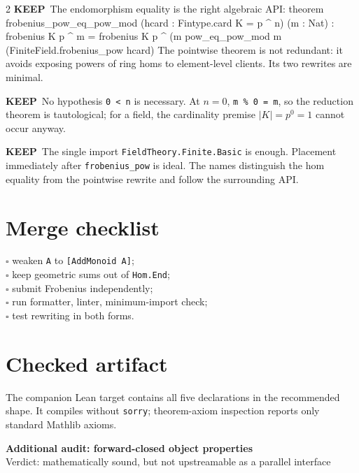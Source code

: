 \documentclass[9pt]{article}
\newenvironment{lean}{\Verbatim[fontsize=\scriptsize,frame=single,framesep=1.2mm,formatcom=\leanfont]}{\endVerbatim}
\newcommand{\good}{\textcolor{keep}{\bfseries KEEP}}
\begin{document}
\begin{multicols}{2}
\good\ The endomorphism equality is the right algebraic API:
\begin{lean}
theorem frobenius_pow_eq_pow_mod
    (hcard : Fintype.card K = p ^ n) (m : Nat) :
    frobenius K p ^ m = frobenius K p ^ (m %
  pow_eq_pow_mod m (FiniteField.frobenius_pow hcard)
\end{lean}
The pointwise theorem is not redundant: it avoids exposing powers of ring homs
to element-level clients.  Its two rewrites are minimal.

\good\ No hypothesis \texttt{0 < n} is necessary.  At $n=0$,
\texttt{m \% 0 = m}, so the reduction theorem is tautological; for a field,
the cardinality premise $|K|=p^0=1$ cannot occur anyway.

\columnbreak
\good\ The single import \texttt{FieldTheory.Finite.Basic} is enough.
Placement immediately after \texttt{frobenius\_pow} is ideal.
The names distinguish the hom equality from the pointwise rewrite and follow
the surrounding API.

\section*{Merge checklist}
$\square$ weaken \texttt{A} to \texttt{[AddMonoid A]};\\
$\square$ keep geometric sums out of \texttt{Hom.End};\\
$\square$ submit Frobenius independently;\\
$\square$ run formatter, linter, minimum-import check;\\
$\square$ test rewriting in both forms.

\section*{Checked artifact}
The companion Lean target contains all five declarations in the recommended
shape.  It compiles without \texttt{sorry}; theorem-axiom inspection reports
only standard Mathlib axioms.
\end{multicols}

\newpage
\begin{center}
 {\Large\bfseries Additional audit: forward-closed object properties}\\[-1mm]
 {\small Verdict: mathematically sound, but not upstreamable as a parallel interface}
\end{center}
\end{document}
